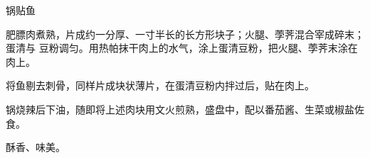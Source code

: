 %
%
%
%
%
%
%
\begin{recipe}{锅贴鱼}

\ingredients


\preparation

肥膘肉煮熟，片成约一分厚、一寸半长的长方形块子；火腿、荸荠混合宰成碎末；蛋清与
豆粉调匀。用热帕抹干肉上的水气，涂上蛋清豆粉，把火腿、荸荠末涂在肉上。

将鱼剔去刺骨，同样片成块状薄片，在蛋清豆粉内拌过后，贴在肉上。

锅烧辣后下油，随即将上述肉块用文火煎熟，盛盘中，配以番茄酱、生菜或椒盐佐食。

\features

酥香、味美。

\end{recipe}

